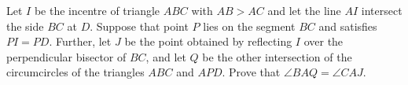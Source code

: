 Let $I$ be the incentre of triangle $ABC$ with $AB>AC$ and let the line $AI$ intersect the side $BC$ at $D$. Suppose that point $P$ lies on the segment $BC$ and satisfies $PI=PD$. Further, let $J$ be the point obtained by reflecting $I$ over the perpendicular bisector of $BC$,  and let $Q$ be the other intersection of the circumcircles of the triangles $ABC$ and $APD$. Prove that $\angle BAQ=\angle CAJ$.